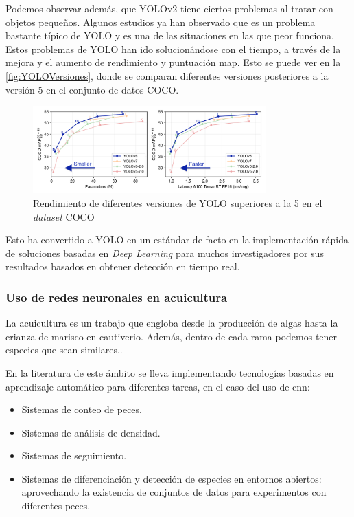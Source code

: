Podemos observar además, que YOLOv2 tiene ciertos problemas al tratar con objetos pequeños. Algunos estudios\cite{bhagyaOverviewDeepLearning2019} ya han observado que es un problema bastante típico de YOLO y es una de las situaciones en las que 
peor funciona.\newline
Estos problemas de YOLO han ido solucionándose con el tiempo, a través de la mejora y el aumento de rendimiento y puntuación \acrshort{map}. Esto se puede ver en la \autoref{fig:YOLOVersiones}, donde se 
comparan diferentes versiones posteriores a la versión 5 en el conjunto de datos COCO.

\begin{figure}[H]
    \centering
    \includegraphics[width=0.8\textwidth]{images/4/YOLOVersiones.png}
    \caption{Rendimiento de diferentes versiones de YOLO superiores a la 5 en el \textit{dataset} COCO\cite{ultralyticsYOLOv8}}
    \label{fig:YOLOVersiones}
\end{figure}

Esto ha convertido a YOLO en un estándar de facto en la implementación rápida de soluciones basadas en \textit{Deep Learning} para muchos investigadores por sus resultados basados en obtener detección en tiempo real.

\subsubsection{Uso de redes neuronales en acuicultura}

La acuicultura es un trabajo que engloba desde la producción de algas hasta la crianza de marisco en cautiverio. Además, dentro de cada rama podemos tener especies que sean similares..

En la literatura de este ámbito se lleva implementando tecnologías basadas en aprendizaje automático para diferentes tareas, en el caso del uso de \acrshort{cnn}:
\begin{itemize}
    \item Sistemas de conteo de peces\cite{castillomoralSistemaConteoPeces2022}.
    \item Sistemas de análisis de densidad.
    \item Sistemas de seguimiento\cite{leeDetectionCatfishActivity2024}.
    \item Sistemas de diferenciación y detección de especies en entornos abiertos\cite{xiaSituSeaCucumber2018}\cite{ladeAutomatedFishSpecies2023}: aprovechando la existencia de conjuntos de datos
    \cite{ulucanLargeScaleDatasetFish2020} para experimentos con diferentes peces.
\end{itemize}

